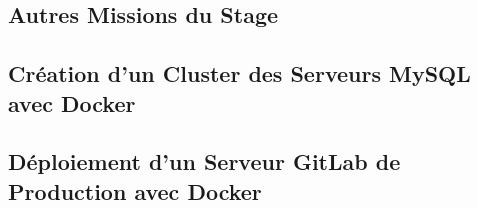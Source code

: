 \begin{appendices}

\chapter{Autres Missions du Stage}

\section{Création d'un Cluster des Serveurs MySQL avec Docker}

\section{Déploiement d'un Serveur GitLab de Production avec Docker}

\end{appendices}

